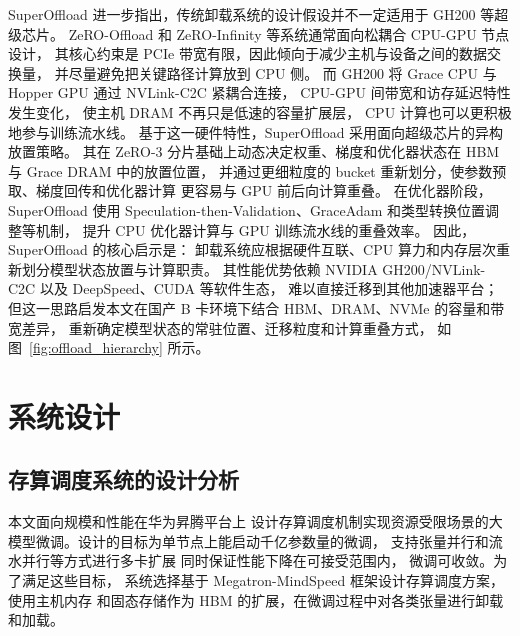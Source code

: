 \documentclass[bachelor,openany,oneside,color,AutoFakeBold=true]{buaathesis}
\begin{document}
SuperOffload 进一步指出，传统卸载系统的设计假设并不一定适用于
GH200 等超级芯片。
ZeRO-Offload 和 ZeRO-Infinity 等系统通常面向松耦合 CPU-GPU 节点设计，
其核心约束是 PCIe 带宽有限，因此倾向于减少主机与设备之间的数据交换量，
并尽量避免把关键路径计算放到 CPU 侧。
而 GH200 将 Grace CPU 与 Hopper GPU 通过 NVLink-C2C 紧耦合连接，
CPU-GPU 间带宽和访存延迟特性发生变化，
使主机 DRAM 不再只是低速的容量扩展层，
CPU 计算也可以更积极地参与训练流水线。
基于这一硬件特性，SuperOffload 采用面向超级芯片的异构放置策略。
其在 ZeRO-3 分片基础上动态决定权重、梯度和优化器状态在 HBM 与
Grace DRAM 中的放置位置，
并通过更细粒度的 bucket 重新划分，使参数预取、梯度回传和优化器计算
更容易与 GPU 前后向计算重叠。
在优化器阶段，SuperOffload 使用
Speculation-then-Validation、GraceAdam 和类型转换位置调整等机制，
提升 CPU 优化器计算与 GPU 训练流水线的重叠效率。
因此，SuperOffload 的核心启示是：
卸载系统应根据硬件互联、CPU 算力和内存层次重新划分模型状态放置与计算职责。
其性能优势依赖 NVIDIA GH200/NVLink-C2C 以及 DeepSpeed、CUDA 等软件生态，
难以直接迁移到其他加速器平台；
但这一思路启发本文在国产 B 卡环境下结合 HBM、DRAM、NVMe 的容量和带宽差异，
重新确定模型状态的常驻位置、迁移粒度和计算重叠方式，
如图~\ref{fig:offload_hierarchy} 所示。



\chapter{系统设计}



\section{存算调度系统的设计分析}

本文面向规模和性能在华为昇腾平台上
设计存算调度机制实现资源受限场景的大
模型微调。设计的目标为单节点上能启动千亿参数量的微调，
支持张量并行和流水并行等方式进行多卡扩展
同时保证性能下降在可接受范围内，
微调可收敛。为了满足这些目标，
系统选择基于 Megatron-MindSpeed 框架设计存算调度方案，使用主机内存
和固态存储作为 HBM 的扩展，在微调过程中对各类张量进行卸载和加载。
\end{document}
